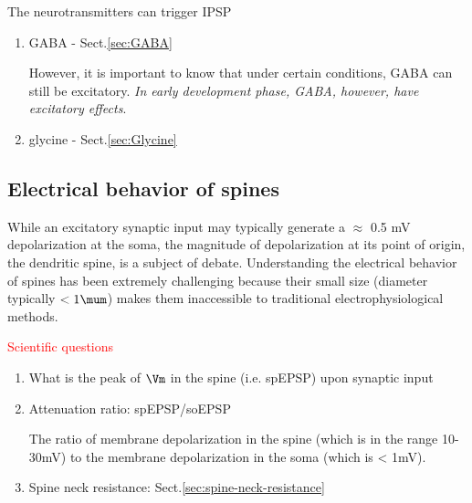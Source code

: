 The neurotransmitters can trigger IPSP
\begin{enumerate}
  \item GABA - Sect.\ref{sec:GABA}
  
  However, it is important to know that under certain conditions, GABA can still
  be excitatory. {\it In early development phase, GABA, however, have excitatory
  effects}.



  \item glycine - Sect.\ref{sec:Glycine}
\end{enumerate}


\subsection{Electrical behavior of spines}
\label{sec:spines-voltage}


While an excitatory synaptic input may typically generate a $\approx$ 0.5 mV
depolarization at the soma, the magnitude of depolarization at its point of
origin, the dendritic spine, is a subject of debate.
Understanding the electrical behavior of spines has been extremely challenging
because their small size (diameter typically $< 1\mum$) makes them inaccessible
to traditional electrophysiological methods.

\textcolor{red}{Scientific questions}
\begin{enumerate}
  \item What is the peak of $\Vm$ in the spine (i.e. spEPSP) upon synaptic input

  \item Attenuation ratio: spEPSP/soEPSP
  
  The ratio of membrane depolarization in the spine (which is in the range
  10-30mV) to the membrane depolarization in the soma (which is < 1mV).
  
  \item Spine neck resistance: Sect.\ref{sec:spine-neck-resistance}
    
\end{enumerate}

